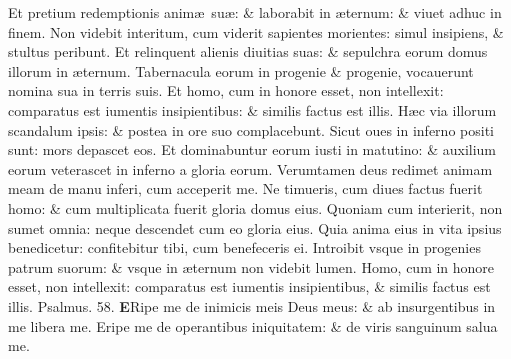 \documentclass[a5paper,10pt]{book}
\def\ae{æ}
\begin{document}
\begin{multicols*}{2}
\newline \color{red} E\color{black}t pretium redemptionis anim\ae \ su\ae : \& laborabit in \ae ternum: \& viuet adhuc in finem.
\newline \color{red} N\color{black}on videbit interitum, cum viderit sapientes morientes: simul insipiens, \& stultus peribunt.
\newline \color{red} E\color{black}t relinquent alienis diuitias suas: \& sepulchra eorum domus illorum in \ae ternum.
\newline \color{red} T\color{black}abernacula eorum in progenie \& progenie, vocauerunt nomina sua in terris suis.
\newline \color{red} E\color{black}t homo, cum in honore esset, non intellexit: comparatus est iumentis insipientibus: \& similis factus est illis.
\newline \color{red} H\color{black}\ae c via illorum scandalum ipsis: \& postea in ore suo complacebunt.
\newline \color{red} S\color{black}icut oues in inferno positi sunt: mors depascet eos.
\newline \color{red} E\color{black}t dominabuntur eorum iusti in matutino: \& auxilium eorum veterascet in inferno a gloria eorum.
\newline \color{red} V\color{black}erumtamen deus redimet animam meam de manu inferi, cum acceperit me.
\newline \color{red} N\color{black}e timueris, cum diues factus fuerit homo: \& cum multiplicata fuerit gloria domus eius.
\newline \color{red} Q\color{black}uoniam cum interierit, non sumet omnia: neque descendet cum eo gloria eius.
\newline \color{red} Q\color{black}uia anima eius in vita ipsius benedicetur: confitebitur tibi, cum benefeceris ei.
\newline \color{red} I\color{black}ntroibit vsque in progenies patrum suorum: \& vsque in \ae ternum non videbit lumen.
\newline \color{red} H\color{black}omo, cum in honore esset, non intellexit: comparatus est iumentis insipientibus, \& similis factus est illis.
\newline \color{red} Psalmus. \hypertarget{ps58}{58.} \color{black}
\vspace{-1em}
\lettrine[lines=2]{\bfseries \color{red} E}{}Ripe me de inimicis meis Deus meus: \& ab insurgentibus in me libera me.
\newline \color{red} E\color{black}ripe me de operantibus iniquitatem: \& de viris sanguinum salua me.

\end{multicols*}
\end{document}
